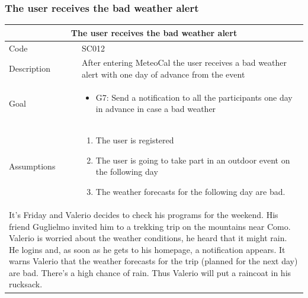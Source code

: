 \documentclass[10pt,a4paper,titlepage]{article}
\begin{document}
\subsubsection{The user receives the bad weather alert}
\begin{tabular}{| p{3cm} | p{10cm} |}
\hline \multicolumn{2}{|c|}{\textbf{The user receives the bad weather alert}} \\ 
\hline Code & SC012 \\ 
\hline Description & After entering MeteoCal the user receives a bad weather alert with one day of advance from the event\\
\hline Goal & \begin{itemize}\item G7: Send a notification to all the participants one day in advance in case a bad weather\end{itemize}\\
\hline Assumptions & \begin{enumerate}
\item The user is registered
\item The user is going to take part in an outdoor event on the following day
\item The weather forecasts for the following day are bad.
\end{enumerate} \\
\hline \multicolumn{2}{|p{13cm}|}{It’s Friday and Valerio decides to check his programs for the weekend. His friend Guglielmo invited him to a trekking trip on the mountains near Como. Valerio is worried about the weather conditions, he heard  that it might rain. He logins and, as soon as he gets to his homepage, a notification appears. It warns Valerio that the weather forecasts for the trip (planned for the next day) are bad. There’s a high chance of rain. Thus Valerio will put a raincoat in his rucksack.}\\
\hline
\end{tabular}
\end{document}
